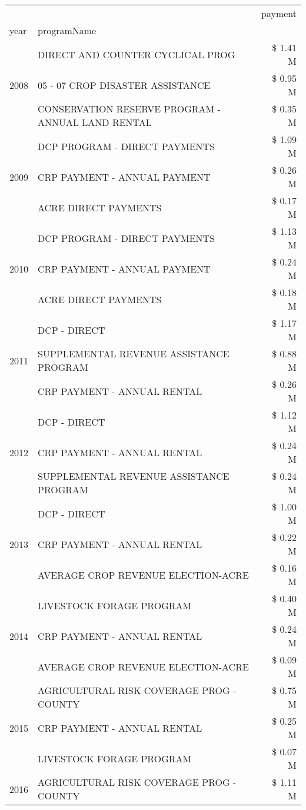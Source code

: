 \begin{tabular}{llr}
\toprule
 &  & payment \\
year & programName &  \\
\midrule
\multirow[t]{3}{*}{2008} & DIRECT AND COUNTER CYCLICAL PROG & \$ 1.41 M \\
 & 05 - 07 CROP DISASTER ASSISTANCE & \$ 0.95 M \\
 & CONSERVATION RESERVE PROGRAM - ANNUAL LAND RENTAL & \$ 0.35 M \\
\cline{1-3}
\multirow[t]{3}{*}{2009} & DCP PROGRAM - DIRECT PAYMENTS & \$ 1.09 M \\
 & CRP PAYMENT - ANNUAL PAYMENT & \$ 0.26 M \\
 & ACRE DIRECT PAYMENTS & \$ 0.17 M \\
\cline{1-3}
\multirow[t]{3}{*}{2010} & DCP PROGRAM - DIRECT PAYMENTS & \$ 1.13 M \\
 & CRP PAYMENT - ANNUAL PAYMENT & \$ 0.24 M \\
 & ACRE DIRECT PAYMENTS & \$ 0.18 M \\
\cline{1-3}
\multirow[t]{3}{*}{2011} & DCP - DIRECT & \$ 1.17 M \\
 & SUPPLEMENTAL REVENUE ASSISTANCE PROGRAM & \$ 0.88 M \\
 & CRP PAYMENT - ANNUAL RENTAL & \$ 0.26 M \\
\cline{1-3}
\multirow[t]{3}{*}{2012} & DCP - DIRECT & \$ 1.12 M \\
 & CRP PAYMENT - ANNUAL RENTAL & \$ 0.24 M \\
 & SUPPLEMENTAL REVENUE ASSISTANCE PROGRAM & \$ 0.24 M \\
\cline{1-3}
\multirow[t]{3}{*}{2013} & DCP - DIRECT & \$ 1.00 M \\
 & CRP PAYMENT - ANNUAL RENTAL & \$ 0.22 M \\
 & AVERAGE CROP REVENUE ELECTION-ACRE & \$ 0.16 M \\
\cline{1-3}
\multirow[t]{3}{*}{2014} & LIVESTOCK FORAGE PROGRAM & \$ 0.40 M \\
 & CRP PAYMENT - ANNUAL RENTAL & \$ 0.24 M \\
 & AVERAGE CROP REVENUE ELECTION-ACRE & \$ 0.09 M \\
\cline{1-3}
\multirow[t]{3}{*}{2015} & AGRICULTURAL RISK COVERAGE PROG - COUNTY & \$ 0.75 M \\
 & CRP PAYMENT - ANNUAL RENTAL & \$ 0.25 M \\
 & LIVESTOCK FORAGE PROGRAM & \$ 0.07 M \\
\cline{1-3}
\multirow[t]{3}{*}{2016} & AGRICULTURAL RISK COVERAGE PROG - COUNTY & \$ 1.11 M \\

\end{tabular}
